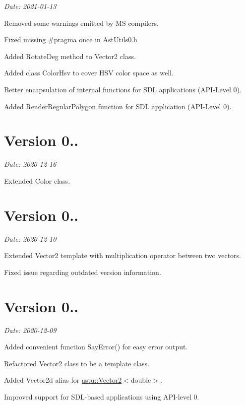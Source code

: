 {\itshape Date\+: 2021-\/01-\/13}


\begin{DoxyItemize}
\item Removed some warnings emitted by MS compilers.
\item Fixed missing {\ttfamily \#pragma once} in Ast\+Utils0.\+h
\item Added {\ttfamily Rotate\+Deg} method to {\ttfamily Vector2} class.
\item Added class \textquotesingle{} {\ttfamily Color\+Hsv} to cover H\+SV color space as well.
\item Better encapsulation of internal functions for S\+DL applications (A\+P\+I-\/\+Level 0).
\item Added {\ttfamily Render\+Regular\+Polygon} function for S\+DL application (A\+P\+I-\/\+Level 0).
\end{DoxyItemize}

\section*{Version 0..}

{\itshape Date\+: 2020-\/12-\/16}
\begin{DoxyItemize}
\item Extended {\ttfamily Color} class.
\end{DoxyItemize}

\section*{Version 0..}

{\itshape Date\+: 2020-\/12-\/10}


\begin{DoxyItemize}
\item Extended {\ttfamily Vector2} template with multiplication operator between two vectors.
\item Fixed issue regarding outdated version information.
\end{DoxyItemize}

\section*{Version 0..}

{\itshape Date\+: 2020-\/12-\/09}


\begin{DoxyItemize}
\item Added convenient function {\ttfamily Say\+Error()} for easy error output.
\item Refactored {\ttfamily Vector2} class to be a template class.
\item Added {\ttfamily Vector2d} alias for {\ttfamily \hyperlink{classastu_1_1Vector2}{astu\+::\+Vector2}$<$double$>$}.
\item Improved support for S\+D\+L-\/based applications using A\+P\+I-\/level 0.
\end{DoxyItemize}

